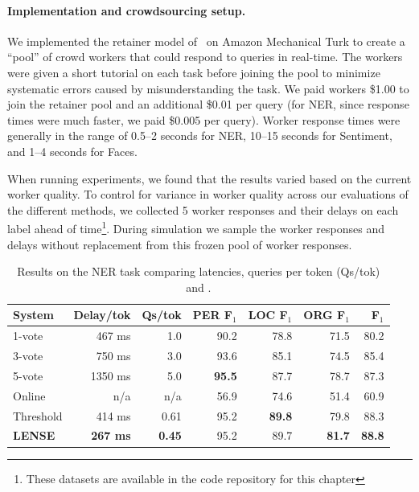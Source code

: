 \paragraph{Implementation and crowdsourcing setup.}
We implemented the retainer model of~\citet{bernstein2011crowds} on Amazon Mechanical Turk to create a ``pool'' of crowd workers that could respond to queries in real-time.
The workers were given a short tutorial on each task before joining the pool to minimize systematic errors caused by misunderstanding the task.
We paid workers \$1.00 to join the retainer pool and an additional \$0.01 per query (for NER, since response times were much faster, we paid \$0.005 per query).
Worker response times were generally in the range of 0.5--2 seconds for NER, 10--15 seconds for Sentiment, and 1--4 seconds for Faces.

When running experiments, we found that the results varied based on the current worker quality. %
To control for variance in worker quality across our evaluations of the different methods, we collected 5 worker responses and their delays on each label ahead of time\footnote{These datasets are available in the code repository for this chapter}.
During simulation we sample the worker responses and delays without replacement from this frozen pool of worker responses.

\begin{table}[t]
\centering
\begin{tabular}{l r r r r r r}
  \toprule
      \textbf{System} & \textbf{Delay/tok} & \textbf{Qs/tok} & \textbf{PER F$_1$} & \textbf{LOC F$_1$} & \textbf{ORG F$_1$} & \textbf{F$_1$}
    \\ \midrule
    1-vote & 467 ms & 1.0 & 90.2 & 78.8 & 71.5 & 80.2 \\
    3-vote & 750 ms & 3.0 & 93.6 & 85.1 & 74.5 & 85.4 \\
    5-vote & 1350 ms & 5.0 & \textbf{95.5} & 87.7 & 78.7 & 87.3  \\ \midrule
    Online & n/a & n/a & 56.9 & 74.6 & 51.4 & 60.9 \\
    Threshold & 414 ms & 0.61 & 95.2 & \textbf{89.8} & 79.8 & 88.3 \\
    \textbf{LENSE} & \textbf{267 ms} & \textbf{0.45} & 95.2 & 89.7 & \textbf{81.7} & \textbf{88.8}  \\
    \bottomrule
\end{tabular}
\caption[Results on NER]{\label{tab:results-ner} Results on the NER task comparing latencies, queries per token (Qs/tok)
and \fone{}.}
\end{table}

